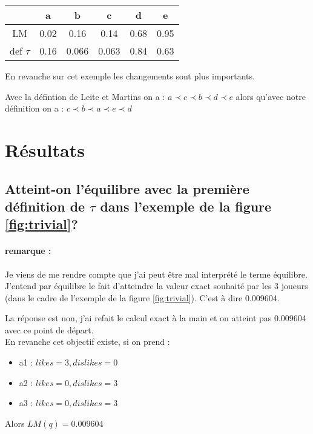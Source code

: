 \documentclass[12pt]{article}
\theoremstyle{defi}
\theoremstyle{not}
\theoremstyle{prob}
\begin{document}
          \begin{tabular}{|c|c|c|c|c|c|}
            \hline
                       & a    & b     & c     & d    & e \\
            \hline
            LM         & 0.02 & 0.16  & 0.14  & 0.68 & 0.95 \\
            \hline
            def $\tau$ & 0.16 & 0.066 & 0.063 & 0.84 & 0.63\\
            \hline
          \end{tabular}

          En revanche sur cet exemple les changements sont plus importants.

          Avec la défintion de Leite et Martins on a : $a \prec c \prec b \prec d \prec e$ alors qu'avec notre définition on a : $c \prec b \prec a \prec e \prec d$


  \section{Résultats}
    \subsection{Atteint-on l'équilibre avec la première définition de $\tau$ dans l'exemple de la figure \ref{fig:trivial}?}

      \paragraph{remarque :}
        Je viens de me rendre compte que j'ai peut être mal interprété le terme équilibre.
        J'entend par équilibre le fait d'atteindre la valeur exact souhaité par les 3 joueurs (dans le cadre de l'exemple de la figure \ref{fig:trivial}).
        C'est à dire 0.009604.

        La réponse est non, j'ai refait le calcul exact à la main et on atteint pas 0.009604 avec ce point de départ.\\

    En revanche cet objectif existe, si on prend :
    \begin{itemize}
      \item a1 : $likes = 3, dislikes = 0$
      \item a2 : $likes = 0, dislikes = 3$
      \item a3 : $likes = 0, dislikes = 3$
    \end{itemize}

    Alors $LM(q) = 0.009604$\\
\end{document}
